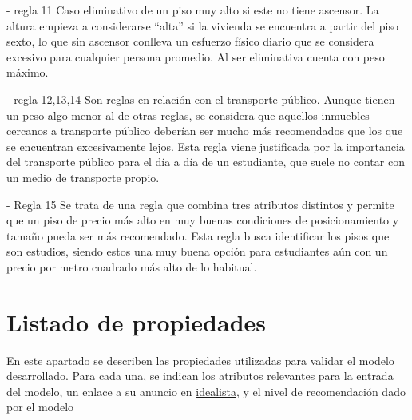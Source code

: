 \documentclass[12pt]{report} %
\begin{document}
    - regla 11
    Caso eliminativo de un piso muy alto si este no tiene ascensor. La altura empieza a 
    considerarse ``alta'' si la vivienda se encuentra a partir del piso sexto, lo que sin ascensor 
    conlleva un esfuerzo físico diario que se considera excesivo para cualquier persona promedio. 
    Al ser eliminativa cuenta con peso máximo.

    - regla 12,13,14
    Son reglas en relación con el transporte público. Aunque tienen un peso algo menor al de otras
    reglas, se considera que aquellos inmuebles cercanos a transporte público deberían ser mucho 
    más recomendados que los que se encuentran excesivamente lejos. Esta regla viene justificada
    por la importancia del transporte público para el día a día de un estudiante, que suele no contar 
    con un medio de transporte propio.

    - Regla 15
    Se trata de una regla que combina tres atributos distintos y permite que un piso de precio más 
    alto en muy buenas condiciones de posicionamiento y tamaño pueda ser más recomendado. Esta regla busca 
    identificar los pisos que son estudios, siendo estos una muy buena opción para estudiantes aún con 
    un precio por metro cuadrado más alto de lo habitual. 

    \chapter{Listado de propiedades}
    \label{chap:propiedades}
    En este apartado se describen las propiedades utilizadas para validar el
    modelo desarrollado. Para cada una, se indican los atributos relevantes para
    la entrada del modelo, un enlace a su anuncio en
    \href{https://www.idealista.com}{idealista}, y el nivel de recomendación
    dado por el modelo
\end{document}
